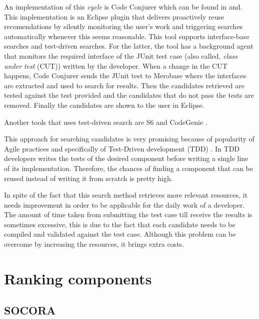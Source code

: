 An implementation of this \textit{cycle} is Code Conjurer which can be found in \citep{Hummel2008} and\citep{Hummel2013}. This implementation is an Eclipse plugin that delivers proactively reuse recomendations by silently monitoring the user's work and triggering searches automatically whenever this seems reasonable. This tool supports interface-base searches and test-driven searches. For the latter, the tool has a background agent that monitors the required interface of the JUnit test case (also called, \textit{class under test} (CUT)) written by the developer. When a change in the CUT happens, Code Conjurer sends the JUnit test to Merobase where the interfaces are extracted and used to search for results. Then the candidates retrieved are tested against the test provided and the candidates that do not pass the tests are removed. Finally the candidates are shown to the user in Eclipse.

Another tools that uses test-driven search are S6 \citep{Reiss2009} and CodeGenie \citep{Lemos2007}.

This approach for searching candidates is very promising because of popularity of Agile practices and specifically of Test-Driven development (TDD) \citep{Beck2003}. In TDD developers writes the tests of the desired component before writing a single line of its implementation. Therefore, the chances of finding a component that can be reused instead of writing it from scratch is pretty high.

In spite of the fact that this search method retrieves more relevant resources, it needs improvement in order to be applicable for the daily work of a developer. The amount of time taken from submitting the test case till receive the results is sometimes excessive, this is due to the fact that each candidate needs to be compiled and validated against the test case. Although this problem can be overcome by increasing the resources, it brings extra costs. 

\section{Ranking components}
\subsection{SOCORA}

